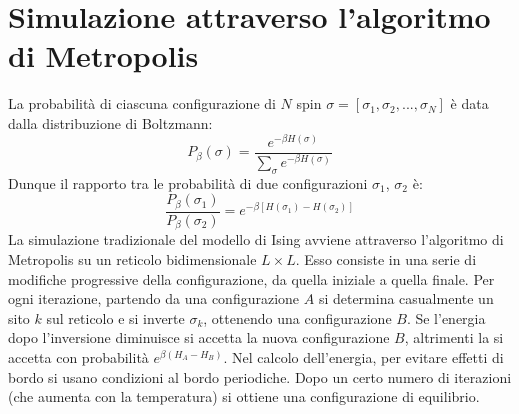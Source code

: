 \documentclass[Lau, noexaminfo, oneside]{sapthesis} %
\begin{document}
\section{Simulazione attraverso l'algoritmo di Metropolis}
La probabilità di ciascuna configurazione di $N$ spin $\sigma = [\sigma_1, \sigma_2, ..., \sigma_N]$ è data dalla distribuzione di Boltzmann:
\begin{equation}
P_{\beta }(\sigma)={\frac {e^{-\beta H(\sigma )}}{\sum\limits_{\sigma} e^{-\beta H(\sigma )}}}
\end{equation}
Dunque il rapporto tra le probabilità di due configurazioni $\sigma_1$, $\sigma_2$ è:
\begin{equation}
\frac{P_{\beta }(\sigma_1)}{P_{\beta }(\sigma_2)} = e^{-\beta [H(\sigma_1) - H(\sigma_2)]}
\end{equation}
La simulazione tradizionale del modello di Ising avviene attraverso l'algoritmo di Metropolis su un reticolo bidimensionale $L \times L$.
Esso consiste in una serie di modifiche progressive della configurazione, da quella iniziale a quella finale. Per ogni iterazione, partendo da una configurazione $A$ si determina casualmente un sito $k$ sul reticolo e si inverte $\sigma_k$, ottenendo una configurazione $B$. Se l'energia dopo l'inversione diminuisce si accetta la nuova configurazione $B$, altrimenti la si accetta con probabilità $e^{\beta (H_A - H_B)}$. Nel calcolo dell'energia, per evitare effetti di bordo si usano condizioni al bordo periodiche. Dopo un certo numero di iterazioni (che aumenta con la temperatura) si ottiene una configurazione di equilibrio. \cite{metropolis-hastings}
\end{document}
